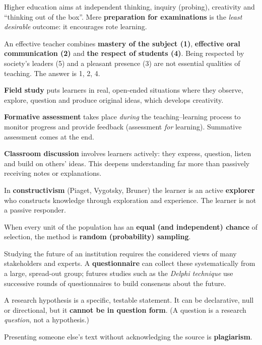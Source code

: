 Higher education aims at independent thinking, inquiry (probing), creativity and ``thinking out of the box''. Mere \textbf{preparation for examinations} is the \emph{least desirable} outcome: it encourages rote learning.

An effective teacher combines \textbf{mastery of the subject (1)}, \textbf{effective oral communication (2)} and \textbf{the respect of students (4)}. Being respected by society's leaders (5) and a pleasant presence (3) are not essential qualities of teaching. The answer is 1, 2, 4.

\textbf{Field study} puts learners in real, open-ended situations where they observe, explore, question and produce original ideas, which develops creativity.

\textbf{Formative assessment} takes place \emph{during} the teaching--learning process to monitor progress and provide feedback (assessment \emph{for} learning). Summative assessment comes at the end.

\textbf{Classroom discussion} involves learners actively: they express, question, listen and build on others' ideas. This deepens understanding far more than passively receiving notes or explanations.

In \textbf{constructivism} (Piaget, Vygotsky, Bruner) the learner is an active \textbf{explorer} who constructs knowledge through exploration and experience. The learner is not a passive responder.

When every unit of the population has an \textbf{equal (and independent) chance} of selection, the method is \textbf{random (probability) sampling}.

Studying the future of an institution requires the considered views of many stakeholders and experts. A \textbf{questionnaire} can collect these systematically from a large, spread-out group; futures studies such as the \emph{Delphi technique} use successive rounds of questionnaires to build consensus about the future.

A research hypothesis is a specific, testable statement. It can be declarative, null or directional, but it \textbf{cannot be in question form}. (A question is a research \emph{question}, not a hypothesis.)

Presenting someone else's text without acknowledging the source is \textbf{plagiarism}.

